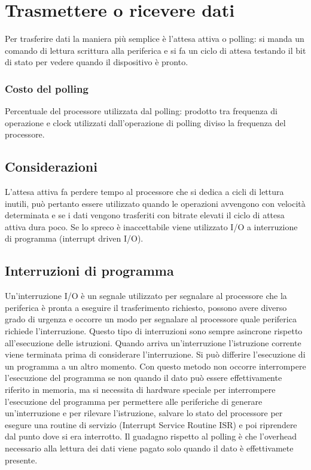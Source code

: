 \section{Trasmettere o ricevere dati}
Per trasferire dati la maniera pi\`u semplice \`e l'attesa attiva o polling: si manda un comando di lettura scrittura alla periferica e si fa un ciclo di attesa testando
il bit di stato per vedere quando il dispositivo \`e pronto.
\subsubsection{Costo del polling}
Percentuale del processore utilizzata dal polling: prodotto tra frequenza di operazione e clock utilizzati dall'operazione di polling diviso la frequenza del processore.
\subsection{Considerazioni}
L'attesa attiva fa perdere tempo al processore che si dedica a cicli di lettura inutili, pu\`o pertanto essere utilizzato quando le operazioni avvengono con velocit\`a
determinata e se i dati vengono trasferiti con bitrate elevati il ciclo di attesa attiva dura poco. Se lo spreco \`e inaccettabile viene utilizzato I/O a interruzione
di programma (interrupt driven I/O). 
\subsection{Interruzioni di programma}
Un'interruzione I/O \`e un segnale utilizzato per segnalare al processore che la periferica \`e pronta a eseguire il trasferimento richiesto, possono avere diverso grado
di urgenza e occorre un modo per segnalare al processore quale periferica richiede l'interruzione. Questo tipo di interruzioni sono sempre asincrone rispetto 
all'esecuzione delle istruzioni. Quando arriva un'interruzione l'istruzione corrente viene terminata prima di considerare l'interruzione. Si pu\`o differire l'esecuzione
di un programma a un altro momento. Con questo metodo non occorre interrompere l'esecuzione del programma se non quando il dato pu\`o essere effettivamente riferito in
memoria, ma si necessita di hardware speciale per interrompere l'esecuzione del programma per permettere alle periferiche di generare un'interruzione e per rilevare 
l'istruzione, salvare lo stato del processore per esegure una routine di servizio (Interrupt Service Routine ISR) e poi riprendere dal punto dove si era interrotto. Il 
guadagno rispetto al polling \`e che l'overhead necessario alla lettura dei dati viene pagato solo quando il dato \`e effettivamete presente. 
